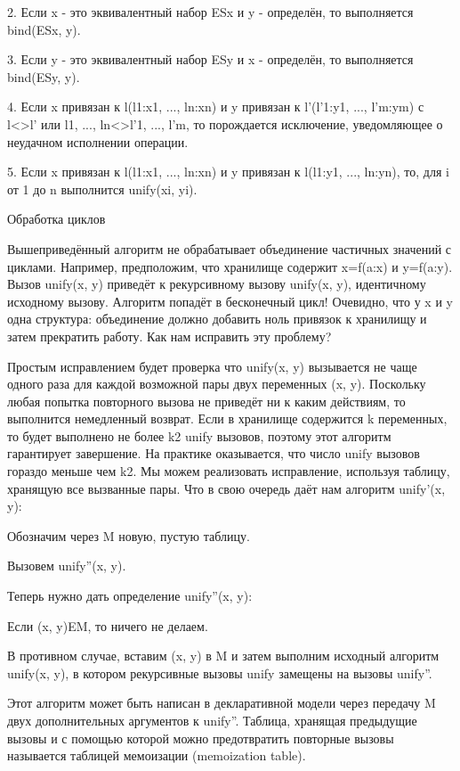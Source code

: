 2. Если x - это эквивалентный набор ESx и y - определён, то выполняется bind(ESx, y).

3. Если y - это эквивалентный набор ESy и x - определён, то выполняется bind(ESy, y).

4. Если x привязан к l(l1:x1, ..., ln:xn) и y привязан к l'(l'1:y1, ..., l'm:ym) с l<>l' или {l1, ..., ln}<>{l'1, ..., l'm}, то порождается исключение, уведомляющее о неудачном исполнении операции.

5. Если x привязан к l(l1:x1, ..., ln:xn) и y привязан к l(l1:y1, ..., ln:yn), то, для i от 1 до n выполнится unify(xi, yi).

Обработка циклов

Вышеприведённый алгоритм не обрабатывает объединение частичных значений с циклами. Например, предположим, что хранилище содержит x=f(a:x) и y=f(a:y). Вызов unify(x, y) приведёт к рекурсивному вызову unify(x, y), идентичному исходному вызову. Алгоритм попадёт в бесконечный цикл! Очевидно, что у x и y одна структура: объединение должно добавить ноль привязок к хранилищу и затем прекратить работу. Как нам исправить эту проблему?

Простым исправлением будет проверка что unify(x, y) вызывается не чаще одного раза для каждой возможной пары двух переменных (x, y). Поскольку любая попытка повторного вызова не приведёт ни к каким действиям, то выполнится немедленный возврат. Если в хранилище содержится k переменных, то будет выполнено не более k2 unify вызовов, поэтому этот алгоритм гарантирует завершение. На практике оказывается, что число unify вызовов гораздо меньше чем k2. Мы можем реализовать исправление, используя таблицу, хранящую все вызванные пары. Что в свою очередь даёт нам алгоритм unify'(x, y):

Обозначим через M новую, пустую таблицу.

Вызовем unify''(x, y).

Теперь нужно дать определение unify''(x, y):

Если (x, y)EM, то ничего не делаем.

В противном случае, вставим (x, y) в M и затем выполним исходный алгоритм unify(x, y), в котором рекурсивные вызовы unify замещены на вызовы unify''.

Этот алгоритм может быть написан в декларативной модели через передачу M двух дополнительных аргументов к unify''. Таблица, хранящая предыдущие вызовы и с помощью которой можно предотвратить повторные вызовы называется таблицей мемоизации (memoization table).


